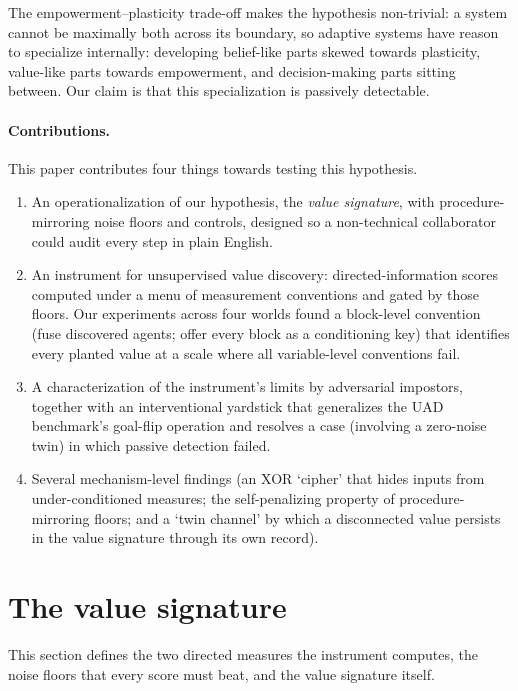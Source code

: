 \documentclass[11pt]{article}
\begin{document}
The empowerment--plasticity trade-off \citep{abel2025plasticity} makes the
hypothesis non-trivial: a system cannot be maximally both across its boundary, so
adaptive systems have reason to specialize internally: developing belief-like parts
skewed towards plasticity, value-like parts towards empowerment, and decision-making
parts sitting between.
Our claim is that this specialization is passively detectable.

\paragraph{Contributions.}
This paper contributes four things towards testing this hypothesis.
\begin{enumerate}[label=(\arabic*), leftmargin=2em]
\item An operationalization of our hypothesis, the \emph{value signature}, with
procedure-mirroring noise floors and controls, designed so a non-technical
collaborator could audit every step in plain English.
\item An instrument for unsupervised value discovery: directed-information scores
computed under a menu of measurement conventions and gated by those floors. Our
experiments across four worlds found a block-level convention (fuse discovered
agents; offer every block as a conditioning key) that identifies every planted value at
a scale where all variable-level conventions fail.
\item A characterization of the instrument's limits by adversarial impostors, together
with an interventional yardstick that generalizes the UAD benchmark's goal-flip
operation and resolves a case (involving a zero-noise twin) in which passive
detection failed.
\item Several mechanism-level findings (an XOR `cipher' that hides inputs from
under-conditioned measures; the self-penalizing property of procedure-mirroring
floors; and a `twin channel' by which a disconnected value persists in the value
signature through its own record).
\end{enumerate}

\section{The value signature}\label{sec:sig}

This section defines the two directed measures the instrument computes, the noise
floors that every score must beat, and the value signature itself.
\end{document}
